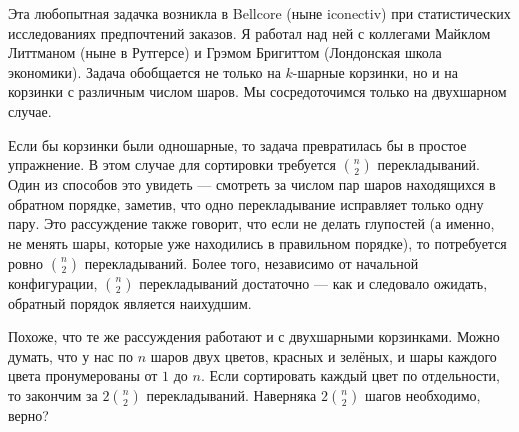 Эта любопытная задачка возникла в Bellcore (ныне iconectiv) при статистических исследованиях предпочтений заказов.
Я работал над ней с коллегами Майклом Литтманом (ныне в Рутгерсе) и Грэмом Бригиттом (Лондонская школа экономики).
Задача обобщается не только на $k$-шарные корзинки, но и на корзинки с различным числом шаров.
Мы сосредоточимся только на двухшарном случае.

\medskip

Если бы корзинки были одношарные, то задача превратилась бы в простое упражнение.
В этом случае  для сортировки требуется $\binom{n}{2}$ перекладываний.
Один из способов это увидеть --- смотреть за числом пар шаров находящихся в обратном порядке, заметив, что одно перекладывание исправляет только одну пару.
Это рассуждение также говорит, что если не делать глупостей (а именно, не менять шары, которые уже находились в правильном порядке), то потребуется ровно $\binom{n}{2}$ перекладываний.
Более того, независимо от начальной конфигурации, $\binom{n}{2}$ перекладываний достаточно --- как и следовало ожидать, обратный порядок является наихудшим.

\medskip

Похоже, что те же рассуждения работают и с двухшарными корзинками.
Можно думать, что у нас по $n$ шаров двух цветов, красных и зелёных, и шары каждого цвета пронумерованы от $1$ до $n$.
Если сортировать каждый цвет по отдельности, то закончим за $2\binom{n}{2}$ перекладываний.
Наверняка $2\binom{n}{2}$ шагов необходимо, верно?


